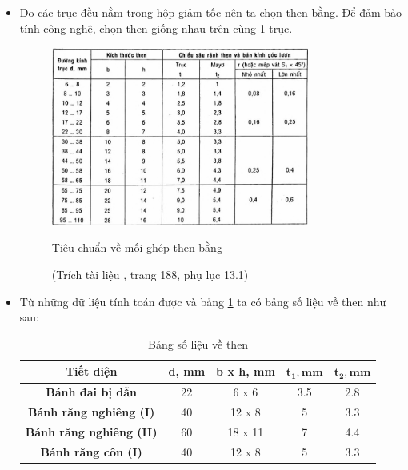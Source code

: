             \begin{itemize}
                \item Do các trục đều nằm trong hộp giảm tốc nên ta chọn then bằng. Để đảm bảo tính công nghệ, chọn then giống nhau trên cùng 1 trục.
                    \begin{figure}[H]
                        \centering
                        \includegraphics[width=0.8\textwidth]{pictures/key_standard.png}
                        \caption{Tiêu chuẩn về mối ghép then bằng}
                        \label{fig:key_standard}
                        \caption*{\footnotesize (Trích tài liệu \cite{btctm}, trang 188, phụ lục 13.1)}
                    \end{figure}
                \item Từ những dữ liệu tính toán được và bảng \ref{fig:key_standard} ta có bảng số liệu về then như sau:
                    \begin{table}[H]
                        \centering
                        \begin{tabular}{|c|c|c|c|c|}
                            \hline
                            \textbf{Tiết diện} & \textbf{d, mm} & \textbf{b x h, mm} & $\mathbf{t_{1}, mm}$ & $\mathbf{t_{2}, mm}$  \\
                            \hline
                            \textbf{Bánh đai bị dẫn} & 22 & 6 x 6 & 3.5 & 2.8  \\
                            \hline
                            \textbf{Bánh răng nghiêng (I)} & 40 & 12 x 8 & 5 & 3.3  \\
                            \hline
                            \textbf{Bánh răng nghiêng (II)} & 60 & 18 x 11 & 7 & 4.4  \\
                            \hline
                            \textbf{Bánh răng côn (I)} & 40 & 12 x 8 & 5 & 3.3  \\
                            \hline
                        \end{tabular}
                        \caption{Bảng số liệu về then}
                    \end{table}
            \end{itemize}

